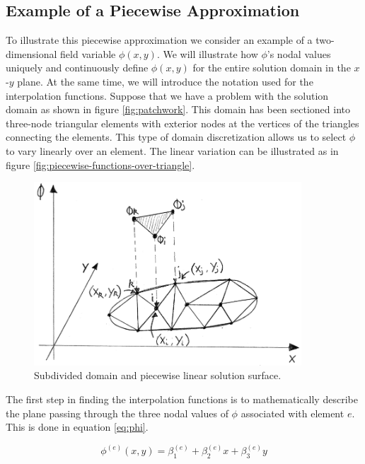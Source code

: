 \subsection{Example of a Piecewise Approximation}
\label{sec:piecewise-approximation}
To illustrate this piecewise approximation we consider
an example of a two-dimensional field variable $\phi(x,y)$.
We will illustrate how $\phi$'s nodal values uniquely and continuously
define $\phi(x,y)$ for the entire solution domain in the $x$-$y$
plane. At the same time, we will introduce the notation used for the
interpolation functions.
Suppose that we have a problem with the solution domain as shown in figure
\vref{fig:patchwork}. This domain has
been sectioned into
three-node triangular elements with exterior nodes at the vertices of
the triangles connecting the elements.
%
This type of domain discretization allows us to select $\phi$ to vary
linearly over an element. The linear variation can be
illustrated as in figure
\vref{fig:piecewise-functions-over-triangle}.

\begin{figure}
  \centering
  \includegraphics[width=10cm]{./images/finite_element_method_piecewise_functions_over_triangle.png}
\caption{Subdivided domain and piecewise linear solution surface.}
\label{fig:piecewise-functions-over-triangle}
\end{figure}

The first step in finding
the interpolation functions is to mathematically describe the plane passing
through the three nodal values of $\phi$ associated with element
$e$. This is done in equation \eqref{eq:phi}.

\begin{equation}
\label{eq:phi}
\phi^{(e)}(x,y) = \beta_1^{(e)} + \beta_2^{(e)} x + \beta_3^{(e)} y
\end{equation}

